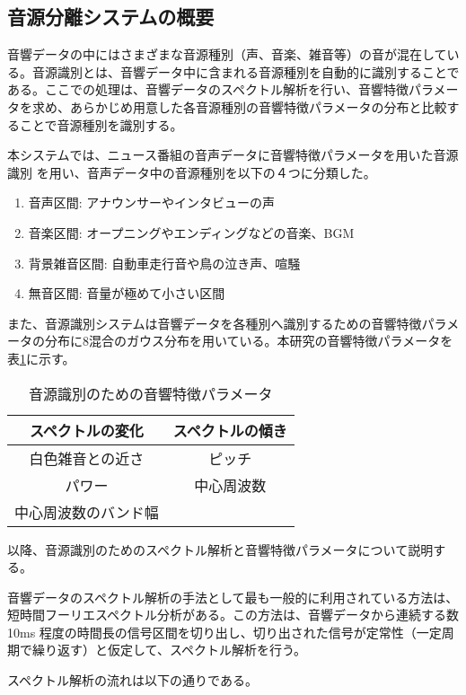 \subsection{音源分離システムの概要}
\renewcommand{\labelenumi}{(\arabic{enumi})}
音響データの中にはさまざまな音源種別（声、音楽、雑音等）の音が混在している。音源識別とは、音響データ中に含まれる音源種別を自動的に識別することである。ここでの処理は、音響データのスペクトル解析を行い、音響特徴パラメータを求め、あらかじめ用意した各音源種別の音響特徴パラメータの分布と比較することで音源種別を識別する。\par
本システムでは、ニュース番組の音声データに音響特徴パラメータを用いた音源識別\cite{shimae_9} を用い、音声データ中の音源種別を以下の４つに分類した。

\begin{enumerate}
\item 音声区間: アナウンサーやインタビューの声
\item 音楽区間: オープニングやエンディングなどの音楽、BGM
\item 背景雑音区間: 自動車走行音や鳥の泣き声、喧騒
\item 無音区間: 音量が極めて小さい区間
\end{enumerate}

また、音源識別システムは音響データを各種別へ識別するための音響特徴パラメータの分布に8混合のガウス分布を用いている。本研究の音響特徴パラメータを表\ref{table:feature_devide_audio}に示す。
\begin{table}[H]
  \begin{center}
    \caption{音源識別のための音響特徴パラメータ}
    \label{table:feature_devide_audio}
    \begin{tabular}{|c|c|} \hline
      スペクトルの変化 & スペクトルの傾き\\ \hline
      白色雑音との近さ & ピッチ  \\ \hline
      パワー & 中心周波数 \\  \hline
      中心周波数のバンド幅 &   \\ \hline
    \end{tabular}
  \end{center}
\end{table}

以降、音源識別のためのスペクトル解析と音響特徴パラメータについて説明する。\par

\par
音響データのスペクトル解析の手法として最も一般的に利用されている方法は、短時間フーリエスペクトル分析がある。この方法は、音響データから連続する数10ms 程度の時間長の信号区間を切り出し、切り出された信号が定常性（一定周期で繰り返す）と仮定して、スペクトル解析を行う。\par
スペクトル解析の流れは以下の通りである。

